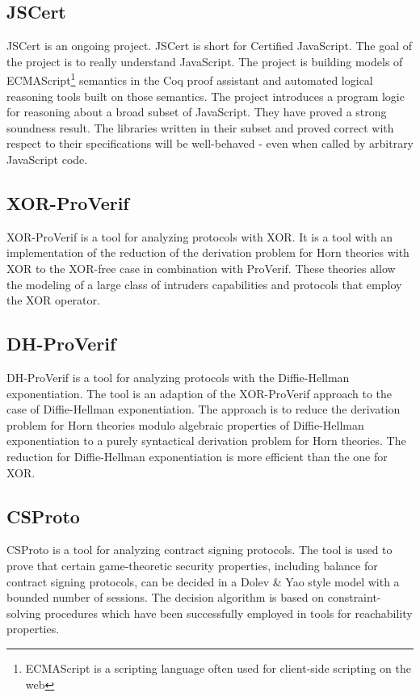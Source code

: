 \documentclass[twosided]{report}
\begin{document}
\subsection{JSCert}
JSCert is an ongoing project. JSCert is short for Certified JavaScript. The goal of the project is to really understand JavaScript. The project is building models of ECMAScript\footnote{ECMAScript is a scripting language often used for client-side scripting on the web} semantics in the Coq proof assistant and automated logical reasoning tools built on those semantics. The project introduces a program logic for reasoning about a broad subset of JavaScript. They have proved a strong soundness result. The libraries written in their subset and proved correct with respect to their specifications will be well-behaved - even when called by arbitrary JavaScript code.


\subsection{XOR-ProVerif}
XOR-ProVerif is a tool for analyzing protocols with XOR. It is a tool with an implementation of the reduction of the derivation problem for Horn theories with XOR to the XOR-free case in combination with ProVerif. These theories allow the modeling of a large class of intruders capabilities and protocols that employ the XOR operator.

\subsection{DH-ProVerif}
DH-ProVerif is a tool for analyzing protocols with the Diffie-Hellman exponentiation. The tool is an adaption of the XOR-ProVerif approach to the case of Diffie-Hellman exponentiation. The approach is to reduce the derivation problem for Horn theories modulo algebraic properties of Diffie-Hellman exponentiation to a purely syntactical derivation problem for Horn theories. The reduction for Diffie-Hellman exponentiation is more efficient than the one for XOR.

\subsection{CSProto}
CSProto is a tool for analyzing contract signing protocols. The tool is used to prove that certain game-theoretic security properties, including balance for contract signing protocols, can be decided in a Dolev \& Yao style model with a bounded number of sessions. The decision algorithm is based on constraint-solving procedures which have been successfully employed in tools for reachability properties.
\end{document}
